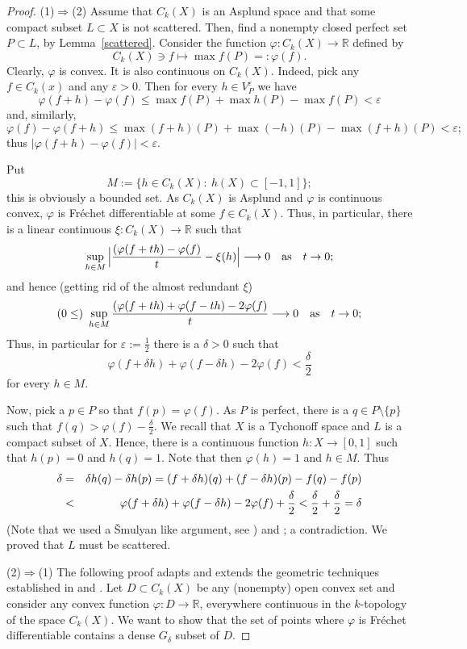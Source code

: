 \documentclass[12pt]{amsart}
\theoremstyle{plain}
\theoremstyle{definition}
\theoremstyle{remark}
\def\ee{\varepsilon}
\def\R{{\mathbb R}}
\def\vv{\varphi}
\def\ee{\varepsilon}
\def\ee{\varepsilon}
\begin{document}
\begin{proof}
(1)$\Longrightarrow$(2)
  Assume that $C_k(X)$ is an Asplund space and that some compact subset $L\subset X$ is not scattered. Then, find a nonempty closed perfect set $P\subset L$, by
Lemma~\ref{scattered}.
Consider the function $\vv: C_k(X)\to\R$ defined by
$$
C_k(X)\ni f\longmapsto \max f(P)=:\vv(f).
$$
Clearly, $\vv$ is convex. It is also continuous on $C_k(X)$. Indeed, pick any $f\in C_k(x)$ and any $\ee>0$.
Then
for every $h\in V_P^\ee$ we have
$$
\vv(f+h)-\vv(f)\le \max f(P)+\max h(P)-\max f(P) < \ee
$$ and, similarly,
$$\vv(f)-\vv(f+h)\le \max (f+h)(P)+\max (-h)(P)-\max (f+h)(P) < \ee;
$$
thus $|\vv(f+h)-\vv(f)| <\ee$.

Put
$$
M:=\{h\in C_k(X):\ h(X) \subset [-1,1]\};
$$
this is obviously a bounded set.
As $C_k(X)$ is Asplund and $\vv$ is continuous convex,
$\vv$ is Fr\'echet differentiable at some $f\in C_k(X)$.
Thus, in particular, there is a linear continuous $\xi: C_k(X)\rightarrow\R$ such that
$$
\sup_{h\in M}\Big|\frac{(\vv(f+th)-\vv(f)}t - \xi(h)\Big|\longrightarrow 0\quad {\rm as}\quad t\to0;
$$
and hence (getting rid of the almost redundant $\xi$)
$$
(0 \le )\ \sup_{h\in M}\frac{(\vv(f+th)+\vv(f-th)-2\vv(f)}t\longrightarrow 0\quad {\rm as}\quad t\to0;
$$
Thus, in particular for $\ee:=\frac12$ there is a $\delta>0$ such that
$$
\vv(f+\delta h)+\vv(f-\delta h)-2\vv(f) < \frac\delta2
$$
for every $h\in M$.

Now, pick a $p\in P$ so that $f(p)=\vv(f)$. As $P$ is perfect, there is a $q\in P\setminus \{p\}$ such that $f(q)> \vv(f)-\frac\delta 2$.
We recall that $X$ is a Tychonoff space and $L$ is a compact subset of $X$. Hence, there is a continuous function $h: X\to [0,1]$ such that
$h(p)=0$ and $h(q)=1$. Note that then $\vv(h)=1$ and $h\in M$.
Thus
\begin{eqnarray*}
\delta & =& \delta h(q)-\delta h(p) = (f+\delta h)(q) + (f-\delta h)(p) -f(q)-f(p) \cr
& <& \vv(f+\delta h) + \vv (f-\delta h) - 2\vv(f) +\frac\delta 2 < \frac\delta 2 + \frac\delta 2 =\delta
\end{eqnarray*}
(Note that we used a \v Smulyan like argument, see \cite{dgz}) and \cite[p. 342--344]{y2}; a contradiction. We proved that $L$ must be scattered.
 \smallskip

(2)$\Longrightarrow$(1)  The following proof adapts and extends the geometric techniques established in  \cite{s} and \cite{es}. Let $D\subset C_k(X)$ be any (nonempty) open convex set and consider any convex function $\vv: D\to \R$, everywhere continuous in the $k$-topology of the space $C_k(X)$.
We want to show that the set of points where $\vv$ is Fr\'echet differentiable contains a dense $G_\delta$ subset of $D$.


\end{proof}
\end{document}
